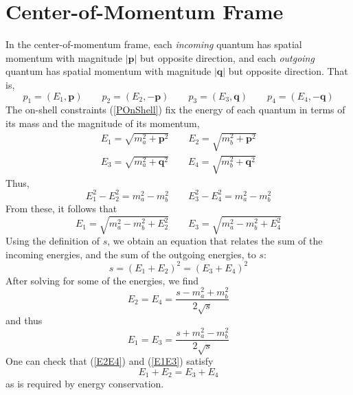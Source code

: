 \section{Center-of-Momentum Frame}
In the center-of-momentum frame, each \textit{incoming} quantum has spatial momentum with magnitude $|\mathbf{p}|$ but opposite direction, and each \textit{outgoing} quantum has spatial momentum with magnitude $|\mathbf{q}|$ but opposite direction. That is,
\begin{equation}
	p_{1} = (E_{1}, \mathbf{p}) \qquad p_{2} = (E_{2}, - \mathbf{p}) \qquad p_{3} = (E_{3}, \mathbf{q}) \qquad p_{4} = (E_{4}, -\mathbf{q})
\end{equation}
The on-shell constraints (\ref{POnShell}) fix the energy of each quantum in terms of its mass and the magnitude of its momentum,
\begin{equation}
\begin{split}
	E_{1} = \sqrt{ \displaystyle m_{a}^{2} + \mathbf{p}^{2}} \qquad E_{2} = \sqrt{ m_{b}^{2} + \mathbf{p}^{2}} \\
	E_{3} = \sqrt{ \displaystyle m_{a}^{2} + \mathbf{q}^{2}} \qquad E_{4} = \sqrt{m_{b}^{2} + \mathbf{q}^{2}}
\end{split} \label{OnShellEs}
\end{equation}
Thus,
\begin{equation}
	E_{1}^{2} - E_{2}^{2} = m_{a}^{2} - m_{b}^{2} \qquad E_{3}^{2} - E_{4}^{2} = m_{a}^{2} - m_{b}^{2}
\end{equation}
From these, it follows that
\begin{equation}
	E_{1} = \sqrt{m_{a}^{2} - m_{b}^{2} + E_{2}^{2}} \qquad E_{3} = \sqrt{m_{a}^{2} - m_{b}^{2} + E_{4}^{2}}
\end{equation}
Using the definition of $s$, we obtain an equation that relates the sum of the incoming energies, and the sum of the outgoing energies, to $s$:
\begin{equation}
	s = (E_{1} + E_{2})^{2} = (E_{3} + E_{4})^{2}
\end{equation}
After solving for some of the energies, we find
\begin{equation}
	E_{2} = E_{4} = \frac{s - m_{a}^{2} + m_{b}^{2}}{2 \sqrt{s}} \label{E2E4}
\end{equation}
and thus
\begin{equation}
	E_{1} = E_{3} = \frac{s + m_{a}^{2} - m_{b}^{2}}{2 \sqrt{s}} \label{E1E3}
\end{equation}
One can check that (\ref{E2E4}) and (\ref{E1E3}) satisfy
\begin{equation}
	E_{1} + E_{2} = E_{3} + E_{4}
\end{equation}
as is required by energy conservation.

